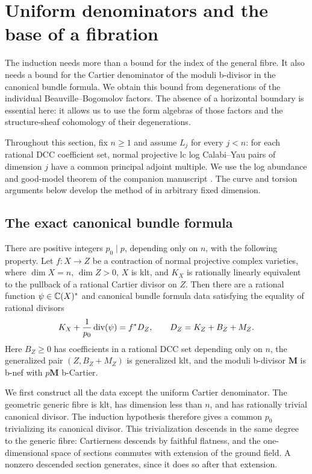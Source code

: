 \section{Uniform denominators and the base of a fibration}
\label{sec:denominators}

The induction needs more than a bound for the index of the general
fibre.  It also needs a bound for the Cartier denominator of the moduli
b-divisor in the canonical bundle formula.  We obtain this bound from
degenerations of the individual Beauville--Bogomolov factors.  The
absence of a horizontal boundary is essential here: it allows us to use
the form algebras of those factors and the structure-sheaf cohomology of
their degenerations.

Throughout this section, fix $n\geq1$ and assume $L_j$ for every
$j<n$: for each rational DCC coefficient set, normal projective lc
log Calabi--Yau pairs of dimension $j$ have a common principal
adjoint multiple.  We use the log abundance and good-model theorem
of the companion manuscript \cite[Theorem~11.1]{LA}.  The curve and
torsion arguments below develop the method of
\cite[Sections~3--7]{R4} in arbitrary fixed dimension.

\subsection{The exact canonical bundle formula}

\begin{proposition}\label{prop:denominator}
There are positive integers $p_0\mid p$, depending only on $n$, with
the following property.  Let $f:X\to Z$ be a contraction of normal
projective complex varieties, where $\dim X=n$, $\dim Z>0$, $X$ is
klt, and $K_X$ is rationally linearly equivalent to the pullback of
a rational Cartier divisor on $Z$.  Then there are a rational function
$\psi\in\mathbb C(X)^*$ and canonical bundle formula data satisfying the
equality of rational divisors
\begin{equation}\label{eq:den-exact}
 K_X+\frac{1}{p_0}\operatorname{div}(\psi)=f^*D_Z,
 \qquad D_Z=K_Z+B_Z+M_Z.
\end{equation}
Here $B_Z\geq0$ has coefficients in a rational DCC set depending only
on $n$, the generalized pair $(Z,B_Z+M_Z)$ is generalized klt,
and the moduli b-divisor $\mathbf M$ is b-nef with $p\mathbf M$
b-Cartier.
\end{proposition}

We first construct all the data except the uniform Cartier denominator.
The geometric generic fibre is klt, has dimension less than $n$, and
has rationally trivial canonical divisor.  The induction hypothesis
therefore gives a common $p_0$ trivializing its canonical divisor.
This trivialization descends in the same degree to the generic fibre:
Cartierness descends by faithful flatness, and the one-dimensional
space of sections commutes with extension of the ground field.  A
nonzero descended section generates, since it does so after that
extension.

